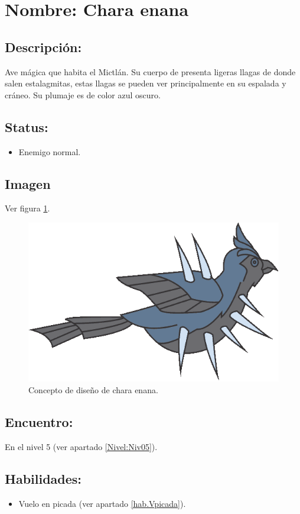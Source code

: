 \section{Nombre: Chara enana}   \label{per:chara}
\subsection{Descripción:}
Ave mágica que habita el Mictlán. Su cuerpo de presenta ligeras llagas de donde salen estalagmitas, estas llagas se pueden ver principalmente en su espalada y cráneo. Su plumaje es de color azul oscuro. 
\subsection{Status:}
\begin{itemize}
	\item Enemigo normal.
\end{itemize}
\subsection{Imagen}
Ver figura \ref{fig:charaEnana}.
\begin{figure}
	\centering
	\includegraphics[height=0.2 \textheight]{Imagenes/charaEnana}
	\caption{Concepto de diseño de chara enana.}
	\label{fig:charaEnana}
\end{figure}
\subsection{Encuentro:}
En el nivel 5 (ver apartado \ref{Nivel:Niv05}).
\subsection{Habilidades:}
\begin{itemize}
	\item Vuelo en picada (ver apartado \ref{hab.Vpicada}).
\end{itemize}

